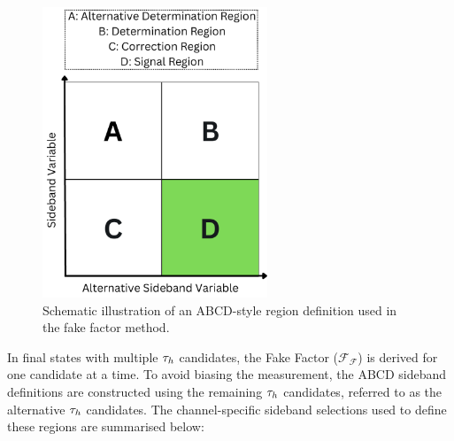\begin{figure}[h]
\centering
\includegraphics[width=0.6\textwidth]{Figures/Chapter6/ABCD.pdf}
\caption[ABCD-style region definition for fake factor estimation.]{Schematic illustration of an ABCD-style region definition used in the fake factor method.}
\label{Figure:Chapter6_ABCD}
\end{figure}

In final states with multiple $\tau_h$ candidates, the Fake Factor ($\mathcal{F_F}$) is derived for one candidate at a time. To avoid biasing the measurement, the ABCD sideband definitions are constructed using the remaining $\tau_h$ candidates, referred to as the alternative $\tau_h$ candidates. The channel-specific sideband selections used to define these regions are summarised below:

